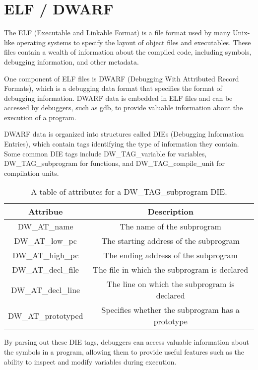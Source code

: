 \section{ELF / DWARF}
The ELF (Executable and Linkable Format) is a file format used by many Unix-like operating systems to specify the layout of object files and executables. These files contain a wealth of information about the compiled code, including symbols, debugging information, and other metadata.

One component of ELF files is DWARF (Debugging With Attributed Record Formats), which is a debugging data format that specifies the format of debugging information. DWARF data is embedded in ELF files and can be accessed by debuggers, such as gdb, to provide valuable information about the execution of a program.

DWARF data is organized into structures called DIEs (Debugging Information Entries), which contain tags identifying the type of information they contain. Some common DIE tags include DW\_TAG\_variable for variables, DW\_TAG\_subprogram for functions, and DW\_TAG\_compile\_unit for compilation units. \\

\begin{table}
\centering
\begin{tabular}{|c|c|}
\hline
\textbf{Attribue} & \textbf{Description} \\ \hline
DW\_AT\_name & The name of the subprogram \\ \hline
DW\_AT\_low\_pc & The starting address of the subprogram \\ \hline
DW\_AT\_high\_pc & The ending address of the subprogram \\ \hline
DW\_AT\_decl\_file & The file in which the subprogram is declared \\ \hline
DW\_AT\_decl\_line & The line on which the subprogram is declared \\ \hline
DW\_AT\_prototyped & Specifies whether the subprogram has a prototype \\ \hline
\end{tabular}
\caption{A table of attributes for a DW\_TAG\_subprogram DIE.}
    \label{fig:subprogram_die}
\end{table}

By parsing out these DIE tags, debuggers can access valuable information about the symbols in a program, allowing them to provide useful features such as the ability to inspect and modify variables during execution.

